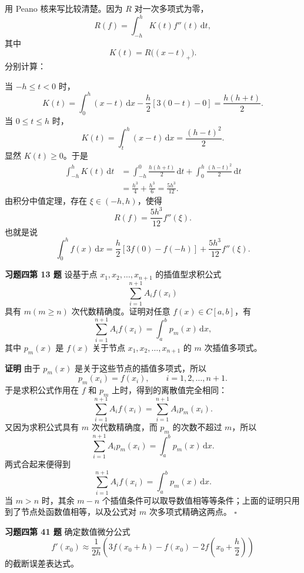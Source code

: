 \documentclass[UTF8,a4paper,11pt]{ctexart}
\newcommand{\dd}{\,\mathrm{d}}
\newcommand{\QED}{\hfill$\square$}
\begin{document}
用 Peano 核来写比较清楚。因为 $R$ 对一次多项式为零，
\[
  R(f)=\int_{-h}^{h}K(t)f''(t)\dd t,
\]
其中
\[
  K(t)=R\bigl((x-t)_+\bigr).
\]
分别计算：

当 $-h\le t<0$ 时，
\[
  K(t)=\int_0^h(x-t)\dd x-\frac h2[3(0-t)-0]
      =\frac{h(h+t)}2.
\]
当 $0\le t\le h$ 时，
\[
  K(t)=\int_t^h(x-t)\dd x
      =\frac{(h-t)^2}{2}.
\]
显然 $K(t)\ge0$。于是
\[
\begin{aligned}
  \int_{-h}^{h}K(t)\dd t
  &=\int_{-h}^{0}\frac{h(h+t)}2\dd t
    +\int_0^h\frac{(h-t)^2}{2}\dd t  \\
  &=\frac{h^3}{4}+\frac{h^3}{6}
   =\frac{5h^3}{12}.
\end{aligned}
\]
由积分中值定理，存在 $\xi\in(-h,h)$，使得
\[
  \boxed{
  R(f)=\frac{5h^3}{12}f''(\xi).}
\]
也就是说
\[
  \int_0^h f(x)\dd x
  =\frac h2[3f(0)-f(-h)]+\frac{5h^3}{12}f''(\xi).
\]

\bigskip\bigskip

\noindent\textbf{习题四\quad 第 13 题}\quad
设基于点 $x_1,x_2,\ldots,x_{n+1}$ 的插值型求积公式
\[
  \sum_{i=1}^{n+1}A_if(x_i)
\]
具有 $m(m\ge n)$ 次代数精确度。证明对任意 $f(x)\in C[a,b]$，有
\[
  \sum_{i=1}^{n+1}A_if(x_i)=\int_a^b p_m(x)\dd x,
\]
其中 $p_m(x)$ 是 $f(x)$ 关于节点 $x_1,x_2,\ldots,x_{n+1}$ 的 $m$ 次插值多项式。

\medskip
\noindent\textbf{证明}\quad
由于 $p_m(x)$ 是关于这些节点的插值多项式，所以
\[
  p_m(x_i)=f(x_i),\qquad i=1,2,\ldots,n+1.
\]
于是求积公式作用在 $f$ 和 $p_m$ 上时，得到的离散值完全相同：
\[
  \sum_{i=1}^{n+1}A_if(x_i)
  =\sum_{i=1}^{n+1}A_ip_m(x_i).
\]
又因为求积公式具有 $m$ 次代数精确度，而 $p_m$ 的次数不超过 $m$，所以
\[
  \sum_{i=1}^{n+1}A_ip_m(x_i)=\int_a^b p_m(x)\dd x.
\]
两式合起来便得到
\[
  \boxed{
  \sum_{i=1}^{n+1}A_if(x_i)=\int_a^b p_m(x)\dd x.}
\]
当 $m>n$ 时，其余 $m-n$ 个插值条件可以取导数值相等等条件；上面的证明只用到了节点处函数值相等，以及公式对 $m$ 次多项式精确这两点。
\QED

\bigskip\bigskip

\noindent\textbf{习题四\quad 第 41 题}\quad
确定数值微分公式
\[
  f'(x_0)\approx
  \frac{1}{2h}\left(3f(x_0+h)-f(x_0)-2f\!\left(x_0+\frac h2\right)\right)
\]
的截断误差表达式。
\end{document}
